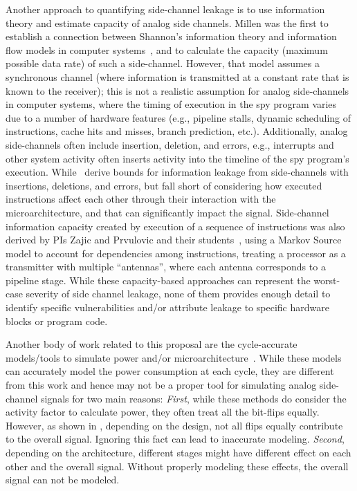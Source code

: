 \documentclass[11 pt]{article}
\begin{document}
Another approach to quantifying side-channel leakage is to use information theory and estimate capacity of analog side channels. Millen was the first to establish a connection between Shannon's information theory and information flow models in computer systems~\cite{Millen87}, and to calculate the capacity (maximum possible data rate) of such a side-channel.
However, that model assumes a synchronous channel (where information is transmitted at a constant rate that is known to the receiver); this is not a realistic assumption for analog side-channels in computer systems, where the timing of execution in the spy program varies
due to a number of hardware features (e.g., pipeline stalls, dynamic scheduling of instructions, cache hits and misses, branch prediction, etc.).
Additionally, analog side-channels often include insertion, deletion, and errors, e.g., interrupts and other system activity often inserts activity into the timeline of the spy program's execution. 
While~\cite{baki18icassp,baki18milcom,baki17} derive bounds for information leakage from side-channels with insertions, deletions, and errors, but fall short of considering how executed instructions affect each other through their interaction with the microarchitecture,
and that can significantly impact the signal. Side-channel information capacity created by execution of a sequence of instructions was also derived by PIs Zajic and Prvulovic and their students~\cite{Baki_2020a}, using a Markov Source model to account for dependencies among instructions, treating a processor as a transmitter with multiple ``antennas'', where each antenna corresponds to a pipeline stage. While these capacity-based approaches can
represent the worst-case severity of side channel leakage, none of them provides enough detail to identify specific vulnerabilities and/or attribute leakage to specific hardware blocks or program code.

Another body of work related to this proposal are the cycle-accurate models/tools to simulate power and/or microarchitecture~\cite{Li:2009:MIP:1669112.1669172,Li:2011:CAM:2132325.2132479,509850,Ardestani:2013:EFM:2495252.2495480,Binkert:2011:GS:2024716.2024718,sesc,5982026,carlson2014aeohmcm}. While these models can accurately model the power consumption at each cycle, they are different from this work and hence may not be a proper tool for simulating analog side-channel signals for two main reasons: \textit{First}, while these methods do consider the activity factor to calculate power, they often treat all the bit-flips equally. However, as shown in \cite{Nader2020}, depending on the design, not all flips equally contribute to the overall signal. Ignoring this fact can lead to inaccurate modeling. \textit{Second}, depending on the architecture, different stages might have different effect on each other and the overall signal. Without properly modeling these effects, the overall signal can not be modeled.
\end{document}

